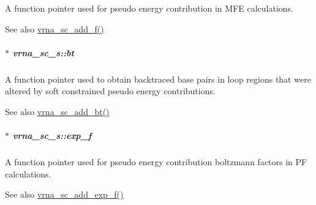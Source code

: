 A function pointer used for pseudo energy contribution in M\+F\+E calculations. 

\begin{DoxySeeAlso}{See also}
\hyperlink{group__generalized__sc_ga8c7d907ec0125cd61c04e0908010a4e9}{vrna\+\_\+sc\+\_\+add\+\_\+f()} 
\end{DoxySeeAlso}
\hypertarget{group__soft__constraints_a2a2aca01782c2b980d7b7fd05b9be89c}{
\subparagraph[{bt}]{$\ast$ vrna\+\_\+sc\+\_\+s\+::bt}}\label{group__soft__constraints_a2a2aca01782c2b980d7b7fd05b9be89c}


A function pointer used to obtain backtraced base pairs in loop regions that were altered by soft constrained pseudo energy contributions. 

\begin{DoxySeeAlso}{See also}
\hyperlink{group__generalized__sc_gabde7d07a79bb9a8f4721aee247b674ea}{vrna\+\_\+sc\+\_\+add\+\_\+bt()} 
\end{DoxySeeAlso}
\hypertarget{group__soft__constraints_a0de08a09f3ccf2f97974d23192668ab0}{
\subparagraph[{exp\+\_\+f}]{$\ast$ vrna\+\_\+sc\+\_\+s\+::exp\+\_\+f}}\label{group__soft__constraints_a0de08a09f3ccf2f97974d23192668ab0}


A function pointer used for pseudo energy contribution boltzmann factors in P\+F calculations. 

\begin{DoxySeeAlso}{See also}
\hyperlink{group__generalized__sc_ga87e382b5d0c9b7d9ce1b79c0473ff700}{vrna\+\_\+sc\+\_\+add\+\_\+exp\+\_\+f()} 
\end{DoxySeeAlso}



